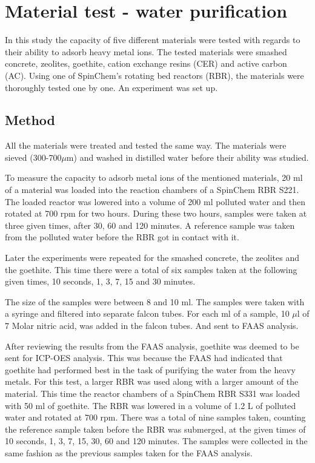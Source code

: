 \section{Material test - water purification}

In this study the capacity of five different materials were tested with regards to their ability to adsorb heavy metal ions. The tested materials were smashed concrete, zeolites, goethite, cation exchange resins (CER) and active carbon (AC). Using one of SpinChem\textsuperscript{\textregistered}’s rotating bed reactors (RBR), the materials were thoroughly tested one by one. An experiment was set up.


\subsection{Method}

All the materials were treated and tested the same way. The materials were sieved (300-700$\mu$m) and washed in distilled water before their ability was studied.


To measure the capacity to adsorb metal ions of the mentioned materials, 20 ml of a material was loaded into the reaction chambers of a SpinChem\textsuperscript{\textregistered} RBR S221. The loaded reactor was lowered into a volume of 200 ml polluted water and then rotated at 700 rpm for two hours. During these two hours, samples were taken at three given times, after 30, 60 and 120 minutes. A reference sample was taken from the polluted water before the RBR got in contact with it.


Later the experiments were repeated for the smashed concrete, the zeolites and the goethite. This time there were a total of six samples taken at the following given times, 10 seconds, 1, 3, 7, 15 and 30 minutes.

The size of the samples were between 8 and 10 ml. The samples were taken with a syringe and filtered into separate falcon tubes. For each ml of a sample, 10 $\mu$l of 7 Molar nitric acid, was added in the falcon tubes. And sent to FAAS analysis.

After reviewing the results from the FAAS analysis, goethite was deemed to be sent for ICP-OES analysis. This was because the FAAS had indicated that goethite had performed best in the task of purifying the water from the heavy metals. For this test, a larger RBR was used along with a larger amount of the material. This time the reactor chambers of a SpinChem\textsuperscript{\textregistered} RBR S331 was loaded with 50 ml of goethite. The RBR was lowered in a volume of 1.2 L of polluted water and rotated at 700 rpm. There was a total of nine samples taken, counting the reference sample taken before the RBR was submerged, at the given times of 10 seconds, 1, 3, 7, 15, 30, 60 and 120 minutes. The samples were collected in the same fashion as the previous samples taken for the FAAS analysis.


